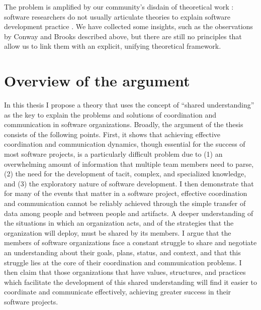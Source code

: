 The problem is amplified by our community's disdain of theoretical work \cite{Hannay2007}: software researchers do not usually articulate theories to explain software development practice \cite{Jorgensen2004}. We have collected some insights, such as the observations by Conway and Brooks described above, but there are still no principles that allow us to link them with an explicit, unifying theoretical framework.


\section{Overview of the argument}

In this thesis I propose a theory that uses the concept of ``shared understanding'' as the key to explain the problems and solutions of coordination and communication in software organizations. Broadly, the argument of the thesis consists of the following points. First, it shows that achieving effective coordination and communication dynamics, though essential for the success of most software projects, is a particularly difficult problem due to (1) an overwhelming amount of information that multiple team members need to parse, (2) the need for the development of tacit, complex, and specialized knowledge, and (3) the exploratory nature of software development. I then demonstrate that for many of the events that matter in a software project, effective coordination and communication cannot be reliably achieved through the simple transfer of data among people and between people and artifacts. A deeper understanding of the situations in which an organization acts, and of the strategies that the organization will deploy, must be shared by its members. I argue that the members of software organizations face a constant struggle to share and negotiate an understanding about their goals, plans, status, and context, and that this struggle lies at the core of their coordination and communication problems. I then claim that those organizations that have values, structures, and practices which facilitate the development of this shared understanding will find it easier to coordinate and communicate effectively, achieving greater success in their software projects.

